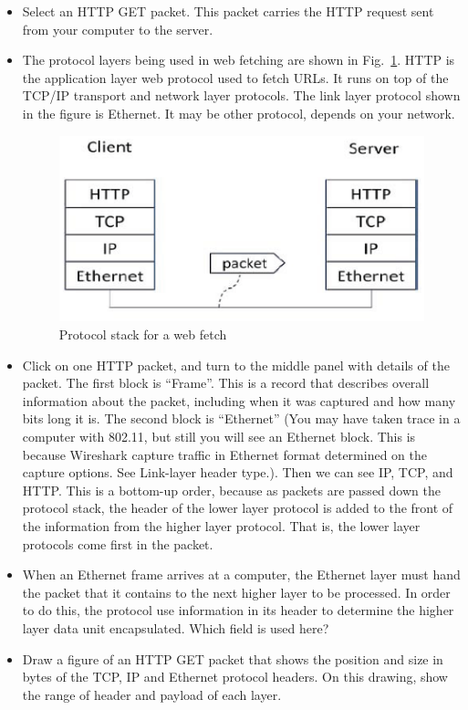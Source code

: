\begin{itemize}
\item Select an HTTP GET packet. This packet carries the HTTP request sent
   from your computer to the server. 
   
\item The protocol layers being used in web fetching are shown in 
 Fig.~\ref{lab_1_protocol_stack_web}. HTTP is the application
 layer web protocol used to fetch URLs. It runs on top of the TCP/IP
  transport and network layer protocols. The link layer protocol shown in the 
  figure is Ethernet. It may be other protocol, depends on your network.   
  
\begin{figure}[!t]
\centering
\includegraphics[width=0.8\columnwidth]{figs/lab_1_protocol_stack_web.eps}
\caption{Protocol stack for a web fetch}\label{lab_1_protocol_stack_web}
\end{figure}

\item Click on one HTTP packet, and turn to the middle panel with details of the packet. The first block is ``Frame''. This is a record that describes overall information about the packet, including when it was captured and how many bits long it is. The second block is ``Ethernet'' (You may have taken trace in a computer with 802.11, but still you will see an Ethernet block. This is because Wireshark capture traffic in Ethernet format determined on the capture options. See Link-layer header type.). Then we can see IP, TCP, and HTTP. This is a bottom-up order, because as packets are passed down the protocol stack, the header of the lower layer protocol is added to the front of the information from the higher layer protocol. That is, the lower layer protocols come first in the packet.

\item When an Ethernet frame arrives at a computer, the Ethernet layer must hand the packet that it contains to the next higher layer to be processed. In order to do this, the protocol use information in its header to determine the higher layer data unit encapsulated. Which field is used here?

\item Draw a figure of an HTTP GET packet that shows the position and size in bytes of the TCP, IP and Ethernet protocol headers. On this drawing, show the range of header and payload of each layer. 

\end{itemize}
 
